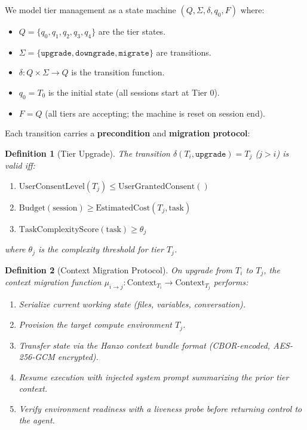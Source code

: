 \documentclass[11pt]{article}
\newtheorem{definition}{Definition}
\begin{document}
We model tier management as a state machine $(Q, \Sigma, \delta, q_0, F)$
where:
\begin{itemize}[leftmargin=1.5em]
    \item $Q = \{q_0, q_1, q_2, q_3, q_4\}$ are the tier states.
    \item $\Sigma = \{\texttt{upgrade}, \texttt{downgrade}, \texttt{migrate}\}$
          are transitions.
    \item $\delta : Q \times \Sigma \to Q$ is the transition function.
    \item $q_0 = T_0$ is the initial state (all sessions start at Tier 0).
    \item $F = Q$ (all tiers are accepting; the machine is reset on session end).
\end{itemize}

Each transition carries a \textbf{precondition} and \textbf{migration protocol}:

\begin{definition}[Tier Upgrade]
The transition $\delta(T_i, \texttt{upgrade}) = T_j$ ($j > i$) is valid iff:
\begin{enumerate}[leftmargin=1.5em, label=(\roman*)]
    \item $\text{UserConsentLevel}(T_j) \leq \text{UserGrantedConsent}()$
    \item $\text{Budget}(\text{session}) \geq \text{EstimatedCost}(T_j, \text{task})$
    \item $\text{TaskComplexityScore}(\text{task}) \geq \theta_j$
\end{enumerate}
where $\theta_j$ is the complexity threshold for tier $T_j$.
\end{definition}

\begin{definition}[Context Migration Protocol]
On upgrade from $T_i$ to $T_j$, the context migration function
$\mu_{i \to j} : \text{Context}_{T_i} \to \text{Context}_{T_j}$ performs:
\begin{enumerate}[leftmargin=1.5em, label=(\roman*)]
    \item Serialize current working state (files, variables, conversation).
    \item Provision the target compute environment $T_j$.
    \item Transfer state via the Hanzo context bundle format (CBOR-encoded,
          AES-256-GCM encrypted).
    \item Resume execution with injected system prompt summarizing the prior
          tier context.
    \item Verify environment readiness with a liveness probe before returning
          control to the agent.
\end{enumerate}
\end{definition}
\end{document}
